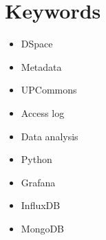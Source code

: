 \clearpage
\section*{Keywords}\label{sec:keywords-en}
\begin{multicols}{3}
    \begin{itemize}
        \item DSpace
        \item Metadata
        \item UPCommons
    \end{itemize}
    \columnbreak
    \begin{itemize}
        \item Access log
        \item Data analysis
        \item Python
    \end{itemize}
    \columnbreak
    \begin{itemize}
        \item Grafana
        \item InfluxDB
        \item MongoDB
    \end{itemize}
\end{multicols}